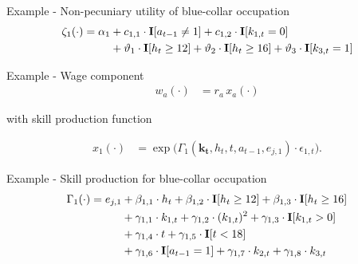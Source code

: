\begin{frame}{Example - Non-pecuniary utility of blue-collar occupation}
%
  \begin{align*}
  \zeta_{1}(\cdot)  = \alpha_1 & + c_{1,1} \cdot {\textbf{I}}[a_{t-1} \neq 1] + c_{1,2} \cdot {\textbf{I}}[k_{1,t} = 0] \\
                              & + \vartheta_1 \cdot {\textbf{I}}[h_t \geq 12] + \vartheta_2 \cdot {\textbf{I}}[h_t \geq 16] + \vartheta_3 \cdot {\textbf{I}}[k_{3,t} = 1]
  \end{align*}
\end{frame}
\begin{frame}{Example - Wage component}
%
\begin{align*}
w_{a}(\cdot) & = r_{a} \, x_{a}(\cdot)
\end{align*}

with skill production function

\begin{align*}
x_{1}(\cdot) & = \exp \big( \Gamma_{1}(\bm{k_t},  h_t, t, a_{t-1}, e_{j,1}) \cdot \epsilon_{1,t} \big).
\end{align*}
\end{frame}
\begin{frame}{Example - Skill production for blue-collar occupation}
%
\begin{align*}
     \Gamma_1(\cdot) = e_{j,1} & + \beta_{1,1} \cdot h_t + \beta_{1, 2} \cdot {\textbf{I}}[h_t \geq 12] + \beta_{1,3} \cdot {\textbf{I}}[h_t\geq 16]\\
                                   & + \gamma_{1, 1} \cdot  k_{1,t} + \gamma_{1,2} \cdot  (k_{1,t})^2 + \gamma_{1,3} \cdot  {\textbf{I}}[k_{1,t} > 0] \\
                                 & + \gamma_{1,4} \cdot  t + \gamma_{1,5} \cdot {\textbf{I}}[t < 18]\\
                                   & + \gamma_{1,6} \cdot {\textbf{I}}[a_{t-1} = 1] + \gamma_{1,7} \cdot  k_{2,t} + \gamma_{1,8} \cdot  k_{3,t}
\end{align*}
%
\end{frame}
